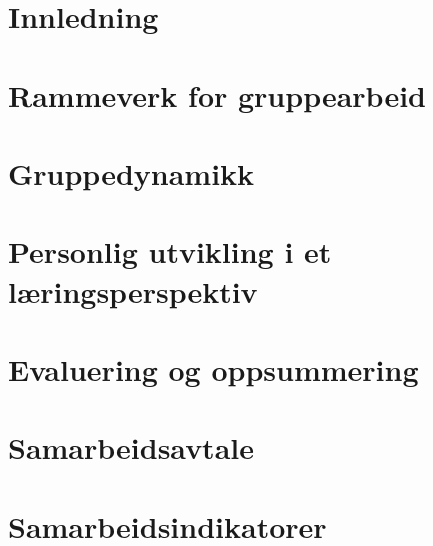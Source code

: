 \documentclass[11pt, a4paper]{report}
\begin{document}


\newpage

\tableofcontents
\listoftables
\listoffigures
\newpage

\chapter{Innledning}


\chapter{Rammeverk for gruppearbeid}


\chapter{Gruppedynamikk}


\chapter{Personlig utvikling i et læringsperspektiv}


\chapter{Evaluering og oppsummering}


\newpage
\appendix
{}
\chapter{Samarbeidsavtale}

\chapter{Samarbeidsindikatorer}





\end{document}
